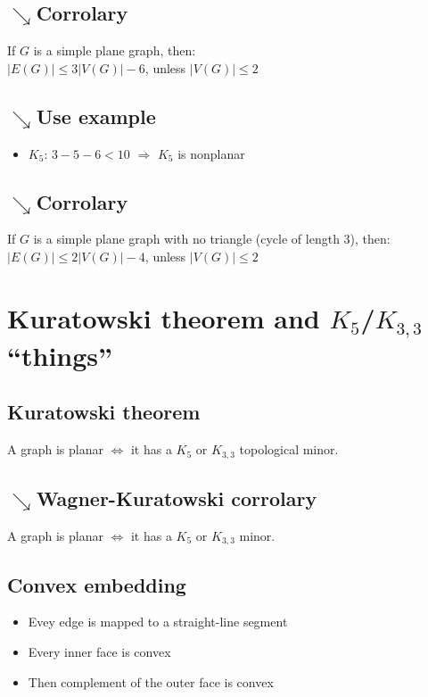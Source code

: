         \subsection{$\searrow$Corrolary}
            If $G$ is a simple plane graph, then:\\
            $|E(G)|\leq 3|V(G)|-6$, unless $|V(G)|\leq 2$
        \subsection{$\searrow$Use example}
            \begin{itemize}
                \item $K_5$: $3-5-6< 10$ $\Rightarrow$ $K_5$ is nonplanar
            \end{itemize}
        \subsection{$\searrow$Corrolary}
            If $G$ is a simple plane graph with no triangle (cycle of length 3), then:\\
                $|E(G)|\leq 2|V(G)|-4$, unless $|V(G)|\leq 2$
    \section{Kuratowski theorem and $K_5$/$K_{3, 3}$ ``things''}
        \subsection{Kuratowski theorem}
            A graph is planar $\Leftrightarrow$ it has a $K_5$ or $K_{3, 3}$ topological minor.
        \subsection{$\searrow$Wagner-Kuratowski corrolary}
            A graph is planar $\Leftrightarrow$ it has a $K_5$ or $K_{3, 3}$ minor.
        \subsection{Convex embedding}
            \begin{itemize}
                \item Evey edge is mapped to a straight-line segment
                \item Every inner face is convex
                \item Then complement of the outer face is convex
            \end{itemize}

